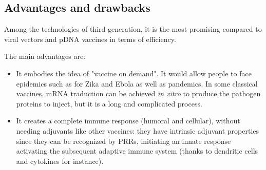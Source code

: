 \documentclass{article}
\begin{document}






        \subsection{Advantages and drawbacks}

            Among the technologies of third generation, it is the most promising compared to viral vectors and pDNA vaccines in terms of efficiency.

            The main advantages are:
            \begin{itemize}
                \item It embodies the idea of "vaccine on demand". It would allow people to face epidemics such as for Zika and Ebola as well as pandemics.
                    In some classical vaccines, mRNA traduction can be achieved \emph{in vitro} to produce the pathogen proteins to inject, but it is a long and complicated process.
                \item It creates a complete immune response (humoral and cellular), without needing adjuvants like other vaccines:
                    they have intrinsic adjuvant properties since they can be recognized by PRRs, initiating an innate response activating
                    the subsequent adaptive immune system (thanks to dendritic cells and cytokines for instance).
            \end{itemize}
\end{document}
